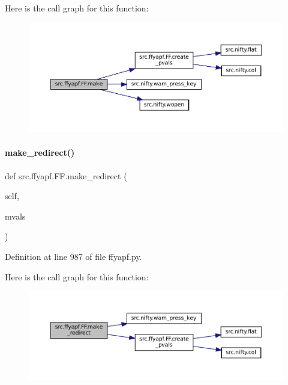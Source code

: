 Here is the call graph for this function\+:
\nopagebreak
\begin{figure}[H]
\begin{center}
\leavevmode
\includegraphics[width=350pt]{classsrc_1_1ffyapf_1_1FF_a18a97385107b6be7f56315516208bb68_cgraph}
\end{center}
\end{figure}
\mbox{\label{classsrc_1_1ffyapf_1_1FF_a6223213f69e13dc5af90501cf4e0a877}} 
\paragraph{\texorpdfstring{make\+\_\+redirect()}{make\_redirect()}}
{\footnotesize\ttfamily def src.\+ffyapf.\+F\+F.\+make\+\_\+redirect (\begin{DoxyParamCaption}\item[{}]{self,  }\item[{}]{mvals }\end{DoxyParamCaption})}



Definition at line 987 of file ffyapf.\+py.

Here is the call graph for this function\+:
\nopagebreak
\begin{figure}[H]
\begin{center}
\leavevmode
\includegraphics[width=350pt]{classsrc_1_1ffyapf_1_1FF_a6223213f69e13dc5af90501cf4e0a877_cgraph}
\end{center}
\end{figure}
\mbox{\label{classsrc_1_1ffyapf_1_1FF_a36882a524f5c6a89284d3d6a97233c3f}} 

